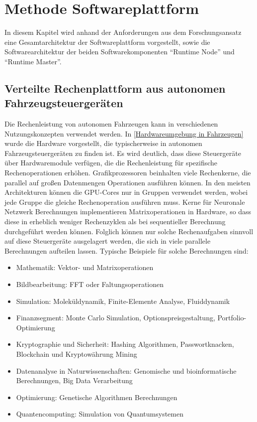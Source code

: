 \chapter{Methode Softwareplattform}
\label{ch:MethodeSoftwareplattform}

In diesem Kapitel wird anhand der Anforderungen aus dem Forschungsansatz eine Gesamtarchitektur der Softwareplattform vorgestellt, sowie die Softwarearchitektur der beiden Softwarekomponenten \enquote{Runtime Node} und \enquote{Runtime Master}. 

\section{Verteilte Rechenplattform aus autonomen Fahrzeugsteuergeräten}

Die Rechenleistung von autonomen Fahrzeugen kann in verschiedenen Nutzungskonzepten verwendet werden. In \autoref{Hardwareumgebung in Fahrzeugen} wurde die Hardware vorgestellt, die typischerweise in autonomen Fahrzeugsteuergeräten zu finden ist. Es wird deutlich, dass diese Steuergeräte über Hardwaremodule verfügen, die die Rechenleistung für spezifische Rechenoperationen erhöhen. Grafikprozessoren beinhalten viele Rechenkerne, die parallel auf großen Datenmengen Operationen ausführen können. In den meisten Architekturen können die GPU-Cores nur in Gruppen verwendet werden, wobei jede Gruppe die gleiche Rechenoperation ausführen muss. Kerne für Neuronale Netzwerk Berechnungen implementieren Matrixoperationen in Hardware, so dass diese in erheblich weniger Rechenzyklen als bei sequentieller Berechnung durchgeführt werden können. Folglich können nur solche Rechenaufgaben sinnvoll auf diese Steuergeräte ausgelagert werden, die sich in viele parallele Berechnungen aufteilen lassen. Typische Beispiele für solche Berechnungen sind:

\begin{itemize}
    \item Mathematik: Vektor- und Matrixoperationen
    \item Bildbearbeitung: FFT oder Faltungsoperationen
    \item Simulation: Moleküldynamik, Finite-Elemente Analyse, Fluiddynamik
    \item Finanzsegment: Monte Carlo Simulation, Optionspreisgestaltung, Portfolio-Optimierung
    \item Kryptographie und Sicherheit: Hashing Algorithmen, Passwortknacken, Blockchain und Kryptowährung Mining
    \item Datenanalyse in Naturwissenschaften: Genomische und bioinformatische Berechnungen, Big Data Verarbeitung
    \item Optimierung: Genetische Algorithmen Berechnungen
    \item Quantencomputing: Simulation von Quantumsystemen
\end{itemize}

